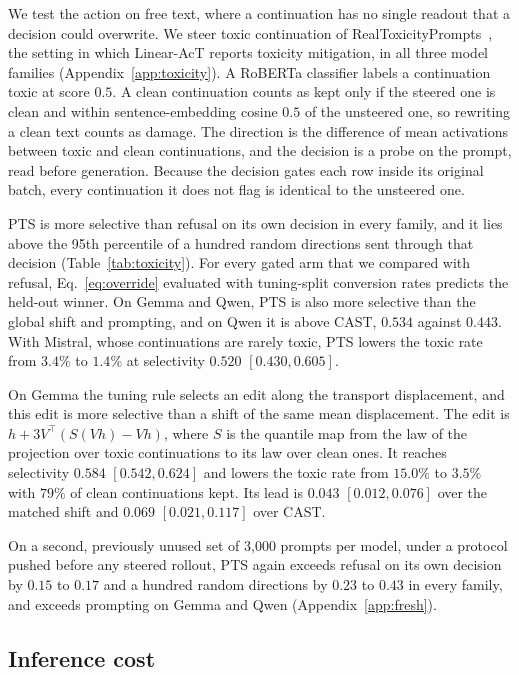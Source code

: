 \documentclass{article}
\begin{document}
We test the action on free text, where a continuation has no single readout
that a decision could overwrite. We steer toxic continuation of
RealToxicityPrompts~\citep{gehman2020realtoxicityprompts}, the setting in which
Linear-AcT reports toxicity mitigation, in all three model families
(Appendix~\ref{app:toxicity}). A RoBERTa classifier labels a continuation toxic
at score $0.5$. A clean continuation counts as kept only if the steered one is
clean and within sentence-embedding cosine $0.5$ of the unsteered one, so
rewriting a clean text counts as damage. The direction is the difference of
mean activations between toxic and clean continuations, and the decision is a
probe on the prompt, read before generation. Because the decision gates each
row inside its original batch, every continuation it does not flag is
identical to the unsteered one.

PTS is more selective than refusal on its own decision in every family, and it
lies above the 95th percentile of a hundred random directions sent through
that decision (Table~\ref{tab:toxicity}). For every gated arm that we compared
with refusal, Eq.~\eqref{eq:override} evaluated with tuning-split conversion
rates predicts the held-out winner. On Gemma and Qwen, PTS is also
more selective than the global shift and prompting, and on Qwen it is above
CAST, $0.534$ against $0.443$. With Mistral, whose continuations are rarely
toxic, PTS lowers the toxic rate from $3.4\%$ to $1.4\%$ at selectivity $0.520$
$[0.430, 0.605]$.

On Gemma the tuning rule selects an edit along the transport displacement,
and this edit is more selective than a shift of the same mean displacement.
The edit is $h+3V^\top(S(Vh)-Vh)$, where $S$ is the quantile map from the law of
the projection over toxic continuations to its law over clean ones. It reaches
selectivity $0.584$ $[0.542, 0.624]$ and lowers the toxic rate from $15.0\%$ to
$3.5\%$ with $79\%$ of clean continuations kept. Its lead is $0.043$
$[0.012, 0.076]$ over the matched shift and $0.069$ $[0.021, 0.117]$ over
CAST.

On a second, previously unused set of 3{,}000 prompts per model, under a
protocol pushed before any steered rollout, PTS again exceeds refusal on its
own decision by $0.15$ to $0.17$ and a hundred random directions by $0.23$ to
$0.43$ in every family, and exceeds prompting on Gemma and Qwen
(Appendix~\ref{app:fresh}).

\subsection{Inference cost}
\end{document}
